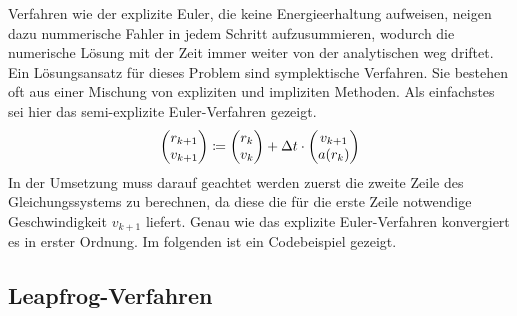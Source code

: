     Verfahren wie der explizite Euler, die keine Energieerhaltung aufweisen, neigen dazu nummerische Fahler in jedem Schritt aufzusummieren, wodurch die numerische Lösung mit der Zeit immer weiter von der analytischen weg driftet.
    Ein Lösungsansatz für dieses Problem sind symplektische Verfahren.
    Sie bestehen oft aus einer Mischung von expliziten und impliziten Methoden.
    Als einfachstes sei hier das semi-explizite Euler-Verfahren gezeigt.
    \[
      \begin{pmatrix}
        r_{k+1} \\ v_{k+1}
      \end{pmatrix}
      \coloneqq
      \begin{pmatrix}
        r_k \\ v_k
      \end{pmatrix}
      + \Delta t \cdot
      \begin{pmatrix}
        v_{k+1} \\ a(r_k)
      \end{pmatrix}
    \]
    In der Umsetzung muss darauf geachtet werden zuerst die zweite Zeile des Gleichungssystems zu berechnen, da diese die für die erste Zeile notwendige Geschwindigkeit $v_{k+1}$ liefert.
    Genau wie das explizite Euler-Verfahren konvergiert es in erster Ordnung.
    Im folgenden ist ein Codebeispiel gezeigt.
    \medskip
    \begin{tcolorbox}[colframe=black,colbacktitle=white,coltitle=black, attach boxed title to top center={yshift=-2mm},enhanced, titlerule=0.1pt, boxrule=0.5pt, arc=5pt,title=Quelltext:\quad Symplektischer Euler-Integrator, breakable]
      
    \end{tcolorbox}


  \subsection{Leapfrog-Verfahren} %
  \label{sub:leapfrog_verfahren}

